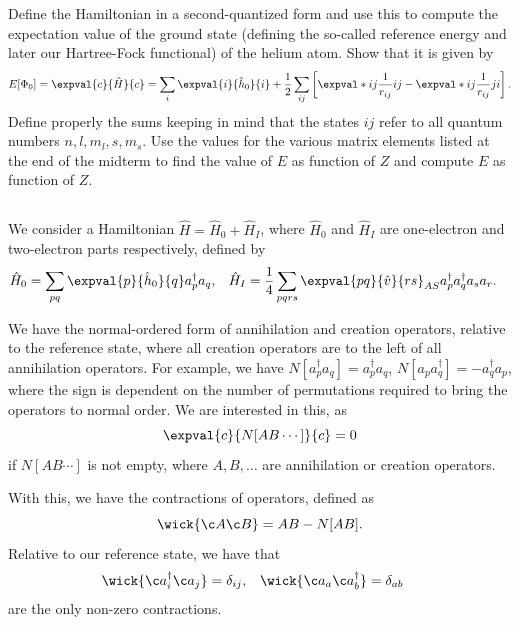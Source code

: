 Define the Hamiltonian in a second-quantized form and use this to compute the expectation value of the ground state (defining the so-called reference energy and later our Hartree-Fock functional) of
the helium atom.
Show that it is given by
\begin{equation}
    E[\Phi_0] = \expval{c}{\hat{H}}{c} = \sum_{i} \expval{i}{\hat{h}_0}{i} + \frac{1}{2} \sum_{ij} \left[\expval*{ij}{\frac{1}{r_{ij}}}{ij} - \expval*{ij}{\frac{1}{r_{ij}}}{ji}\right].
\end{equation}
Define properly the sums keeping in mind that the states $ij$ refer to all quantum numbers $n, l, m_l, s, m_s$.
Use the values for the various matrix elements listed at the end of the midterm to find the value of $E$ as function of $Z$ and compute $E$ as function of $Z$.

\subsection{}
We consider a Hamiltonian $\hat{H} = \hat{H}_0 + \hat{H}_I$, where $\hat{H}_0$ and $\hat{H}_I$ are one-electron and two-electron parts respectively, defined by
\begin{align}
    \hat{H}_0 &= \sum_{p q} \expval{p}{\hat{h}_0}{q} a_p^\dagger a_q, &
    \hat{H}_I &= \frac{1}{4} \sum_{pqrs} \expval{pq}{\hat{v}}{rs}_{AS} a_p^\dagger a_q^\dagger a_s a_r.
\end{align}

We have the normal-ordered form of annihilation and creation operators, relative to the reference state, where all creation operators are to the left of all annihilation operators.
For example, we have $N[a_p^\dagger a_q] = a_p^\dagger a_q$, $N[a_p a_q^\dagger] = -a_q^\dagger a_p$, where the sign is dependent on the number of permutations required to bring the operators to normal order.
We are interested in this, as
\begin{equation*}
    \expval{c}{N[A B\dotsm]}{c} = 0
\end{equation*}
if $N[A B \dotsm]$ is not empty, where $A, B, \dotsc$ are annihilation or creation operators.

With this, we have the contractions of operators, defined as
\begin{equation*}
    \wick{\c A \c B} = AB - N[AB].
\end{equation*}
Relative to our reference state, we have that
\begin{align*}
    \wick{\c a_i^\dagger \c a_j} &= \delta_{i j}, &
    \wick{\c a_a \c a_b^\dagger} &= \delta_{a b}
\end{align*}
are the only non-zero contractions.

